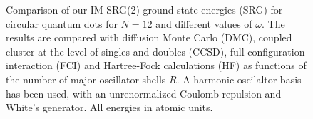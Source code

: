 \documentclass[amsmath, amssymb, aps, floatfix, nofootinbib, preprintnumbers,showpacs, superscriptaddress, twocolumn]{revtex4-1}
\begin{document}
\begin{figure}
\begin{center}
{        }
    \end{center}
    \caption{Comparison of our IM-SRG(2) ground state energies (SRG)
      for circular quantum dots for $N=12$ and different values of
      $\omega$. The results are compared with diffusion Monte
      Carlo (DMC), coupled cluster at the level of singles and doubles
      (CCSD), full configuration interaction (FCI) and Hartree-Fock
      calculations (HF) as functions of the number of major oscillator
      shells $R$. A harmonic oscilaltor basis has been used, with an
      unrenormalized Coulomb repulsion and White's generator. All
      energies in atomic units.}
   \label{fig:N12}
\end{figure}
\end{document}
